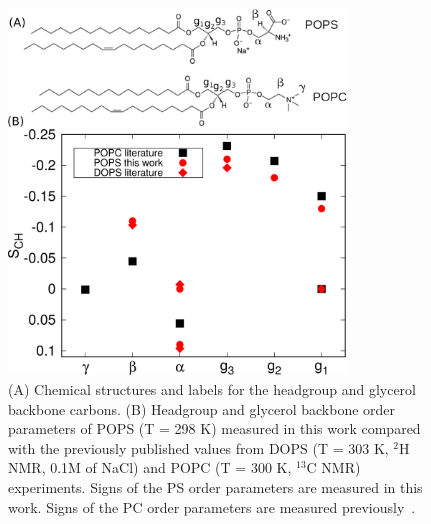 \documentclass[aps,prl,superscriptaddress,twocolumn]{revtex4}
\begin{document}
\begin{figure}[!htb]
  \centering
  \includegraphics[width=9.0cm]{../Figs/PCPScomp.eps}
  \caption{\label{HGorderParameters}
    (A) Chemical structures and labels for the headgroup and glycerol backbone carbons.
    (B) Headgroup and glycerol backbone order parameters of POPS (T = 298 K) measured in this work compared
    with the previously published values from DOPS (T = 303 K, $^2$H NMR, 0.1M of NaCl) \cite{browning80} and 
    POPC  (T = 300 K, $^{13}$C NMR) \cite{ferreira13} experiments. Signs of the PS order parameters
    are measured in this work. Signs of the PC order parameters are measured previously~\cite{ferreira16}.
  }
\end{figure}
\end{document}
